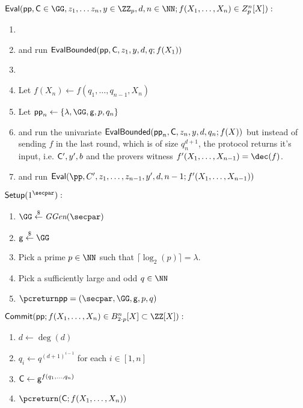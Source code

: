 \documentclass{article}
\theoremstyle{definition}
\begin{document}
 \begin{mdframed}
\begin{minipage}{\textwidth}
			$\pro{Eval}(\crs, \gr{C}\in \GG, z_1,\dots z_n,y \in \ZZ_p, d,n \in \NN; f(X_1,\dots,X_n)\in Z_p^n[X]) :$ 			\begin{enumerate}[nolistsep]
			\item {} 
			\item \pcind[1] \prover and \verifier run $\textsf{{EvalBounded}}(\textsf{pp},\mathsf{C},z_1,y,d,q;f(X_1))$ 
			\item \pcelse
			\item \pcind[1] Let $f(X_n)\gets f(q_1,\dots,q_{n-1},X_n)$
			\item \pcind[1] Let $\crs_n \gets \{\lambda,\GG,\gr{g},p,q_n\}$
			\item \pcind[1] \prover and \verifier run the univariate $\textsf{{EvalBounded}}(\textsf{pp}_n,\mathsf{C},z_n,y,d,q_n;f(X))$ but instead of sending $f$ in the last round, which is of size $q_n^{d+1}$, the protocol returns it's input, i.e. $\mathsf{C}',y',b$ and the provers witness $f'(X_1,\dots,X_{n-1})=\dec(f)$.
			\item \pcind[1]\prover and \verifier run $\eval(\pp,C',z_1,\dots,z_{n-1},y',d,n-1;f'(X_1,\dots,X_{n-1}))$
		    \end{enumerate}
      \end{minipage}
\end{mdframed}

 
 \begin{mdframed}[userdefinedwidth=\textwidth]
\begin{minipage}{\textwidth}
	\begin{flushleft}
	$\pro{Setup}(1^\secpar):$
		\begin{enumerate}[nolistsep]
			\item $ \GG \sample \ggen(\secpar)$
			\item $ \gr{g} \sample \GG$
			\item Pick a prime $p\in \NN$ such that $\lceil\log_2(p)\rceil=\lambda$.
			\item Pick a sufficiently large and odd $q\in \NN$
			\item $\pcreturn \params = (\secpar,\GG,\gr{g},p,q)$
		\end{enumerate}
	$\pro{Commit}(\crs;f(X_1,\dots,X_n) \in B_{2\cdot p}^n[X]\subset \ZZ[X]):$ 		\begin{enumerate}[nolistsep]
			\item $d\gets \deg(d)$
			\item $q_i\gets q^{(d+1)^{i-1}}$ for each $i\in [1,n]$
			\item $\mathsf{C} \gets \mathsf{g}^{f(q_1,\dots,q_n)}$
			\item $\pcreturn (\gr{C};f(X_1,\dots,X_n))$
		\end{enumerate}
			\end{flushleft}
\end{minipage}
\end{mdframed}
\end{document}
